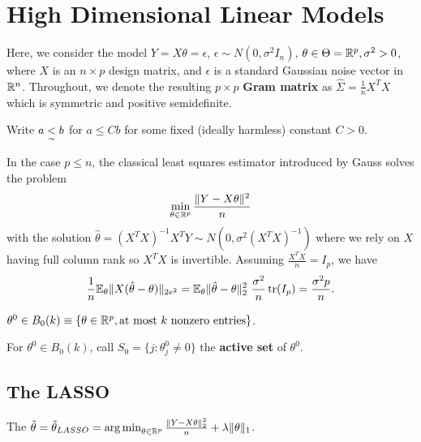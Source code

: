 \section{High Dimensional Linear Models}
\label{sec:high-dimens-line-1}

Here, we consider the model $Y = X \theta = \epsilon$, $\epsilon \sim
N(0, \sigma^{2} I_{n})$, $\theta \in \Theta = \mathbb{R}^{p}, \sigma^{2} > 0$,
where $X$ is an $n \times p$ design matrix, and $\epsilon$ is a
standard Gaussian noise vector in $\mathbb{R}^{n}$.  Throughout, we denote the
resulting $p \times p$ \textbf{Gram matrix} as $\hat \Sigma =
\frac{1}{n} X^{T} X$ which is symmetric and positive semidefinite.

Write $a \underset{\sim}{<} b$ for $a \leq C b$ for some fixed (ideally
harmless) constant $C > 0$.

\begin{thm}
  In the case $p \leq n$, the classical least squares estimator
  introduced by Gauss solves the problem
  \begin{equation}
    \label{eq:30} \min_{\theta \in \mathbb{R}^{p}} \frac{\| Y - X \theta
      \|^{2}}{n}
  \end{equation}
  with the solution $\hat \theta = (X^{T}X)^{-1} X^{T}Y \sim N(0,
  \sigma^{2}(X^{T} X)^{-1})$ where we rely on $X$ having full column
  rank so $X^{T} X$ is invertible.  Assuming $\frac{X^{T} X}{n} =
  I_{p}$, we have
  \begin{align}
    \label{eq:13}
    \frac{1}{n} \E_{\theta} \| X(\hat \theta - \theta) \|_{2e^{2}} =
    \E_{\theta} \| \hat \theta - \theta \|_{2}^{2} \
    \frac{\sigma^{2}}{n} \tr(I_{p}) = \frac{\sigma^{2} p }{n}.
  \end{align}
\end{thm}

\begin{defn}
  \label{sec:case-p-leq}
  $\theta^{0} \in B_{0}(k) \equiv \{ \theta \in \mathbb{R}^{p}, \text{at most
    $k$ nonzero entries} \} $.

  For $\theta^{0} \in B_{0}(k)$, call $S_{0} = \{ j : \theta_{j}^{0}
  \neq 0 \} $ the \textbf{active set} of $\theta^{0}$.
\end{defn}

\subsection{The LASSO}
\label{sec:lasso}

\begin{defn}
  \label{sec:case-p-leq-1}
  The $\tilde \theta = \tilde \theta_{LASSO} = \operatorname*{arg\,min}_{\theta \in
    \mathbb{R}^{p}} \frac{\| Y - X \theta \|_{2}^{2}}{n}  + \lambda \| \theta \|_{1}$.
\end{defn}

